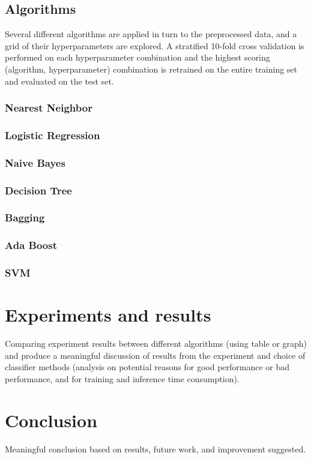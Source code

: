 \documentclass[landscape,twocolumn]{article}
\begin{document}
\subsection{Algorithms}
Several different algorithms are applied in turn to the preprocessed data, and a grid of their hyperparameters are explored. A stratified 10-fold cross validation is performed on each hyperparameter combination and the highest scoring (algorithm, hyperparameter) combination is retrained on the entire training set and evaluated on the test set.

\subsubsection{Nearest Neighbor}
\subsubsection{Logistic Regression}
\subsubsection{Naive Bayes}
\subsubsection{Decision Tree}
\subsubsection{Bagging}
\subsubsection{Ada Boost}
\subsubsection{SVM}

\section{Experiments and results}
Comparing experiment results between different algorithms (using table or graph) and produce a meaningful discussion of results from the experiment and choice of classifier methods (analysis on potential reasons for good performance or bad performance, and for training and inference time consumption).

\section{Conclusion}
Meaningful conclusion based on results, future work, and improvement suggested.
\end{document}

